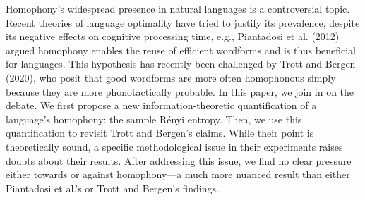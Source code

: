 Homophony's widespread presence in natural languages is a controversial topic. Recent theories of language optimality have tried to justify its prevalence, despite its negative effects on cognitive processing time, e.g., Piantadosi et al. (2012) argued homophony enables the reuse of efficient wordforms and is thus beneficial for languages. This hypothesis has recently been challenged by Trott and Bergen (2020), who posit that good wordforms are more often homophonous simply because they are more phonotactically probable. In this paper, we join in on the debate. We first propose a new information-theoretic quantification of a language's homophony: the sample Rényi entropy. Then, we use this quantification to revisit Trott and Bergen's claims. While their point is theoretically sound, a specific methodological issue in their experiments raises doubts about their results. After addressing this issue, we find no clear pressure either towards or against homophony---a much more nuanced result than either Piantadosi et al.'s or Trott and Bergen's findings.
